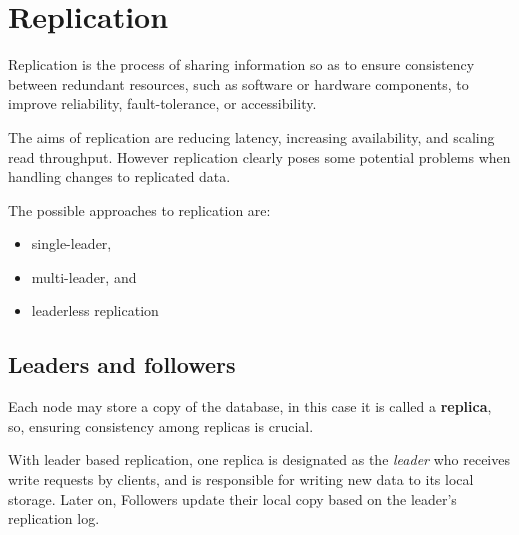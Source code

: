 \chapter{Replication}

\begin{definition}
   [Replication]
   Replication is the process of sharing information so as to ensure consistency between redundant resources, such as software or hardware components, to improve reliability, fault-tolerance, or accessibility.

\end{definition}

The aims of replication are reducing latency, increasing availability, and scaling read throughput.
However replication clearly poses some potential problems when handling changes to replicated data.
{The possible approaches to replication are:\ns
\begin{itemize}
   \item single-leader,
   \item multi-leader, and
   \item leaderless replication
\end{itemize}}

\section{Leaders and followers}
Each node may store a copy of the database, in this case it is called a \textbf{replica}, so, ensuring consistency among replicas is crucial.



With leader based replication, one replica is designated as the \textit{leader} who receives write requests by clients, and is responsible for writing new data to its local storage.
Later on, Followers update their local copy based on the leader's
replication log.

